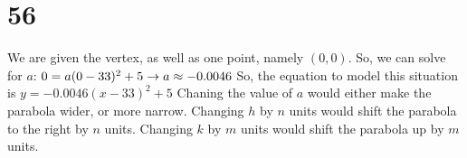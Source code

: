 \documentclass{article}
\theoremstyle{definition}
\begin{document}
\section*{56}
We are given the vertex, as well as one point, namely $(0,0)$. So, we can solve for $a$:\newline
$0=a(0-33)^2+5\newline\rightarrow a\approx -0.0046$\newline
So, the equation to model this situation is $y=-0.0046(x-33)^2+5$ Chaning the value of $a$ would either make the parabola wider, or more narrow. Changing 
$h$ by $n$ units would shift the parabola to the right by $n$ units. Changing $k$ by $m$ units would shift the parabola up by $m$ units.
\end{document}
